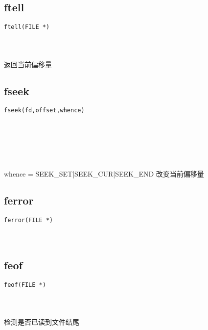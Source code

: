 \documentclass[10pt,a4paper]{article}
\begin{document}
\subsection{ftell}
\begin{spacing}{2.0}
\lstset{language=C,numbers=none}
\begin{lstlisting}
ftell(FILE *)
\end{lstlisting}
{\large\color[rgb]{0.2,0.4,0.6}{*:}}
\paragraph{ \ \ }返回当前偏移量
\end{spacing}

\subsection{fseek}
\begin{spacing}{2.0}
\lstset{language=C,numbers=none}
\begin{lstlisting}
fseek(fd,offset,whence)
\end{lstlisting}
{\large\color[rgb]{0.2,0.4,0.6}{fd:}} \\
{\large\color[rgb]{0.2,0.4,0.6}{offset:}} \\
{\large\color[rgb]{0.2,0.4,0.6}{whence:}}
\paragraph{ \ \ }whence = SEEK\_SET|SEEK\_CUR|SEEK\_END 改变当前偏移量
\end{spacing}

\subsection{ferror}
\begin{spacing}{2.0}
\lstset{language=C,numbers=none}
\begin{lstlisting}
ferror(FILE *)
\end{lstlisting}
{\large\color[rgb]{0.2,0.4,0.6}{*:}}
\paragraph{ \ \ }
\end{spacing}

\subsection{feof}
\begin{spacing}{2.0}
\lstset{language=C,numbers=none}
\begin{lstlisting}
feof(FILE *)
\end{lstlisting}
{\large\color[rgb]{0.2,0.4,0.6}{*:}}
\paragraph{ \ \ }检测是否已读到文件结尾
\end{spacing}
\end{document}
